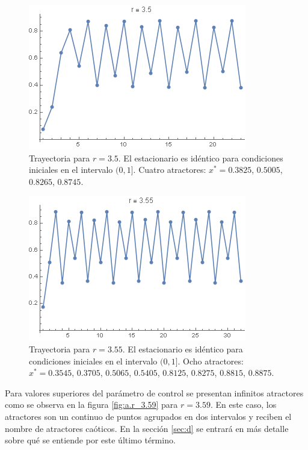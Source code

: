 \documentclass[aps,prb,twocolumn,superscriptaddress,floatfix,longbibliography]{revtex4-2}
\newcounter{para}
\begin{document}
\begin{figure}[htp]
    \includegraphics[clip=true,width=0.7\columnwidth]{a.r_3.5.png}
    \caption{Trayectoria para $r = 3.5$. El estacionario es idéntico para condiciones iniciales en el intervalo $(0,1]$. Cuatro atractores: $x^* = 0.3825$, $0.5005$, $0.8265$, $0.8745$.}
     \label{fig:a.r_3.5}
\end{figure}


\begin{figure}[htp]
    \includegraphics[clip=true,width=0.7\columnwidth]{a.r_3.55.png}
    \caption{Trayectoria para $r = 3.55$. El estacionario es idéntico para condiciones iniciales en el intervalo $(0,1]$. Ocho atractores: $x^* = 0.3545$, $0.3705$,  $0.5065$, $0.5405$, $0.8125$,  $0.8275$, $0.8815$, $0.8875$.}
     \label{fig:a.r_3.55}
\end{figure}

Para valores superiores del parámetro de control se presentan infinitos atractores como se observa en la figura \ref{fig:a.r_3.59} para $r = 3.59$. En este caso, los atractores son un continuo de puntos agrupados en dos intervalos y reciben el nombre de atractores caóticos. En la sección \ref{sec:d} se entrará en más detalle sobre qué se entiende por este último término.
\end{document}
